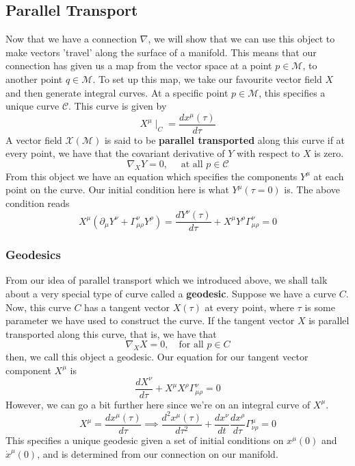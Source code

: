 \subsection{Parallel Transport} 
Now that we have a connection $\nabla $, we will show
that we can use this
object to make vectors 'travel' along the surface of a manifold. 
This means that our connection has given us a map from the vector space at 
a point $p \in \mathcal{ M } $, to another point $ q \in \mathcal{ M } $. 
To set up this map, we take our favourite vector field $ X$ and 
then generate integral curves. At a specific point $p \in \mathcal{ M }$, 
this specifies a unique curve $ \mathcal{ C } $. This curve is given by 
\[
	X^\mu \mid_C = \frac{ d x^\mu ( \tau ) }{ d \tau } 
\] 
A vector field  $\mathcal{ X } ( \mathcal{ M } )  $ is said to 
be \textbf{parallel transported} along this curve if at every point, 
we have that the covariant derivative of $ Y $ with respect to 
$ X $ is zero. 
\[
 \nabla _ X Y = 0 , \quad \text{ at all } p \in \mathcal{ C } 
\] From this object 
we have an equation which specifies the components 
$ Y ^ \mu $ at each point on the curve. Our initial 
condition here is what $ Y ^ \mu ( \tau = 0  ) $ is. 
The above condition reads 
\[
 X^ \mu \left(  \partial  _ \mu Y ^ \nu + \Gamma^ \nu _{ \mu \rho } Y ^ \rho   \right) 
 = \frac{d Y ^ \nu ( \tau ) }{ d\tau } + X ^ \mu Y ^ \rho \Gamma^\nu _{ \mu \rho } = 0 
\] 
\subsubsection{Geodesics}
From our idea of parallel transport which 
we introduced above, we shall talk about a very special type 
of curve called a \textbf{geodesic}. Suppose we 
have a curve $ C $. Now, this curve $ C $ has a tangent vector 
$ X( \tau )  $ at every point, where $ \tau $ is some parameter 
we have used to construct the curve. If the tangent vector $ X $ 
is parallel transported along this curve, that is, we have that 
\[
 \nabla_ X X = 0 , \quad \text{for all } p \in C 
\] then, we call this object a geodesic. 
Our equation for our tangent vector component $ X^ \mu$
is 
\[
 \frac{d X^ \nu }{ d \tau } + X ^ \mu X ^ \rho \Gamma ^ \nu _{ \mu \rho } = 0 
\] However, we can go a bit further here 
since we're on an integral curve of $X ^ \mu $. 
 \[
	 X ^ \mu = \frac{d x ^ \mu ( \tau ) }{ d \tau } \implies \frac{d ^ 2 x ^ \mu ( \tau ) }{ d \tau ^ 2 } + \frac{d x ^ \nu }{ dt } 
	 \frac{d x ^ \rho  }{ d \tau } \Gamma^\mu_{ \nu \rho }  =0 
\] This specifies a unique geodesic given 
a set of initial conditions on $ x ^ \mu ( 0 ) $ and $ \dot{ x} ^ \mu ( 0 ) $, 
and is determined from our connection on our manifold. 


